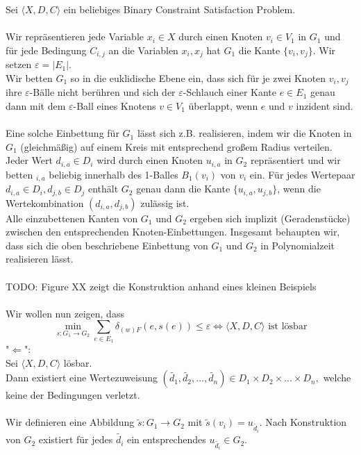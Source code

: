 \documentclass[a4paper, 12pt, twoside]{article}
\theoremstyle{Format1} %
\begin{document}
Sei $\langle X,D,C \rangle$ ein beliebiges Binary Constraint Satisfaction Problem.
\\
\\
Wir repräsentieren jede Variable $x_i \in X$ durch einen Knoten $v_i \in V_1$ in $G_1$ und für jede Bedingung $C_{i,j}$ an die Variablen $x_i, x_j$
hat $G_1$ die Kante $\{v_i, v_j\}$. Wir setzen $\varepsilon = |E_1|$.
\\
Wir betten $G_1$ so in die euklidische Ebene ein, dass sich für je zwei Knoten $v_i,v_j$ ihre $\varepsilon$-Bälle nicht berühren und
sich der $\varepsilon$-Schlauch einer Kante $e \in E_1$ genau dann mit dem $\varepsilon$-Ball eines Knotens $v \in V_1$ überlappt, wenn $e$ und $v$ inzident sind.
\\
\\
Eine solche Einbettung für $G_1$ lässt sich z.B. realisieren, indem wir die Knoten in $G_1$ (gleichmäßig) auf einem Kreis mit entsprechend großem Radius verteilen.
\\
Jeder Wert $d_{i,a} \in D_i$ wird durch einen Knoten $u_{i,a}$ in $G_2$ repräsentiert und wir betten $_{i,a}$ beliebig innerhalb des 1-Balles $B_1(v_i)$ von $v_i$ ein.
Für jedes Wertepaar $d_{i,a} \in D_i, d_{j,b} \in D_j$ enthält $G_2$ genau dann die Kante $\{u_{i,a},u_{j,b}\}$, wenn die Wertekombination $(d_{i,a},d_{j,b})$
zulässig ist.
\\
Alle einzubettenen Kanten von $G_1$ und $G_2$ ergeben sich implizit (Geradenstücke) zwischen den entsprechenden Knoten-Einbettungen.
Insgesamt behaupten wir, dass sich die oben beschriebene Einbettung von $G_1$ und $G_2$ in Polynomialzeit realisieren lässt.
\\
\\
TODO: Figure XX zeigt die Konstruktion anhand eines kleinen Beispiels
\\
\\
Wir wollen nun zeigen, dass
$$ \min_{s: G_1 \to G_2} \sum_{e \in E_1} \delta_{(w)F}(e, s(e)) \leq \varepsilon \iff \langle X,D,C \rangle \text{ ist lösbar}$$
"$\Leftarrow$":
\\
Sei $\langle X,D,C \rangle$ lösbar.
\\
Dann existiert eine Wertezuweisung $(\tilde{d_1},\tilde{d_2},...,\tilde{d_n}) \in {D_1 \times D_2 \times ... \times D_n},$ welche keine der Bedingungen verletzt.
\\
\\
Wir definieren eine Abbildung $\tilde{s}:G_1 \to G_2$ mit $\tilde{s}(v_i) = u_{\tilde{d_i}}$.
Nach Konstruktion von $G_2$ existiert für jedes $\tilde{d_i}$ ein entsprechendes $u_{\tilde{d_i}} \in G_2$.
\end{document}
